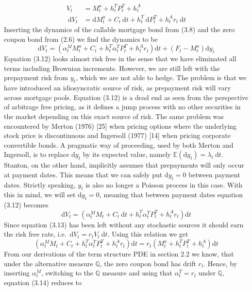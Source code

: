 \documentclass[12pt,twoside]{reedthesis}
\begin{document}
\[
\begin{aligned}
V_{t} &=M_{t}^{a}+h_{t}^{T} P_{t}^{T}+h_{t}^{A} \\
\mathrm{~d} V_{t} &=\mathrm{d} M_{t}^{a}+C_{t} \mathrm{~d} t+h_{t}^{T} \mathrm{~d} P_{t}^{T}+h_{t}^{A} r_{t} \mathrm{~d} t
\end{aligned}
\]
Inserting the dynamics of the callable mortgage bond from (3.8) and the zero coupon bond from (2.6) we find the dynamics to be
\[
\mathrm{d} V_{t}=\left(\alpha_{t}^{M} M_{t}^{a}+C_{t}+h_{t}^{T} \alpha_{t}^{T} P_{t}^{T}+h_{t}^{A} r_{t}\right) \mathrm{d} t+\left(F_{t}-M_{t}^{a}\right) \mathrm{d} y_{t}
\]
Equation (3.12) looks almost risk free in the sense that we have eliminated all terms including Brownian increments. However, we are still left with the prepayment risk from \(y_{t}\), which we are not able to hedge. The problem is that we have introduced an idiosyncratic source of risk, as prepayment risk will vary across mortgage pools. Equation (3.12) is a dead end as seen from the perspective of arbitrage free pricing, as it defines a jump process with no other securities in the market depending on this exact source of risk. The same problem was encountered by Merton (1976) {[}25{]} when pricing options where the underlying stock price is discontinuous and Ingersoll (1977) {[}14{]} when pricing corporate convertible bonds. A pragmatic way of proceeding, used by both Merton and Ingersoll, is to replace \(\mathrm{d} y_{t}\) by its expected value, namely \(\mathbb{E}\left(\mathrm{d} y_{t}\right)=\lambda_{t} \mathrm{~d} t\). Stanton, on the other hand, implicitly assumes that prepayments will only occur at payment dates. This means that we can safely put \(\mathrm{d} y_{t}=0\) between payment dates. Strictly speaking, \(y_{t}\) is also no longer a Poisson process in this case. With this in mind, we will set \(\mathrm{d} y_{t}=0\), meaning that between payment dates equation (3.12) becomes
\[
\mathrm{d} V_{t}=\left(\alpha_{t}^{M} M_{t}+C_{t} \mathrm{~d} t+h_{t}^{T} \alpha_{t}^{T} P_{t}^{T}+h_{t}^{A} r_{t}\right) \mathrm{d} t
\]
Since equation (3.13) has been left without any stochastic sources it should earn the risk free rate, i.e.~\(\mathrm{d} V_{t}=r_{t} V_{t} \mathrm{~d} t\). Using this relation we get
\[
\left(\alpha_{t}^{M} M_{t}+C_{t}+h_{t}^{T} \alpha_{t}^{T} P_{t}^{T}+h_{t}^{A} r_{t}\right) \mathrm{d} t=r_{t}\left(M_{t}^{a}+h_{t}^{T} P_{t}^{T}+h_{t}^{A}\right) \mathrm{d} t
\]
From our derivations of the term structure PDE in section \(2.2\) we know, that under the alternative measure \(\mathbb{Q}\), the zero coupon bond has drift \(r_{t}\). Hence, by inserting \(\alpha_{t}^{M}\), switching to the \(\mathbb{Q}\) measure and using that \(\alpha_{t}^{T}=r_{t}\) under \(\mathbb{Q}\), equation (3.14) reduces to
\end{document}
